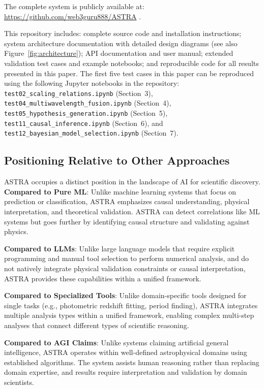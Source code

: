 \documentclass[usenatbib]{rasti}
\begin{document}
The complete system is publicly available at: \url{https://github.com/web3guru888/ASTRA} \citep{astra_github}.

This repository includes: complete source code and installation instructions; system architecture documentation with detailed design diagrams (see also Figure~\ref{fig:architecture}); API documentation and user manual; extended validation test cases and example notebooks; and reproducible code for all results presented in this paper. The first five test cases in this paper can be reproduced using the following Jupyter notebooks in the repository: \texttt{test02\_scaling\_relations.ipynb} (Section~3), \texttt{test04\_multiwavelength\_fusion.ipynb} (Section~4), \texttt{test05\_hypothesis\_generation.ipynb} (Section~5), \texttt{test11\_causal\_inference.ipynb} (Section~6), and \texttt{test12\_bayesian\_model\_selection.ipynb} (Section~7).

\subsection{Positioning Relative to Other Approaches}

ASTRA occupies a distinct position in the landscape of AI for scientific discovery. \textbf{Compared to Pure ML}: Unlike machine learning systems that focus on prediction or classification, ASTRA emphasizes causal understanding, physical interpretation, and theoretical validation. ASTRA can detect correlations like ML systems but goes further by identifying causal structure and validating against physics.

\textbf{Compared to LLMs}: Unlike large language models that require explicit programming and manual tool selection to perform numerical analysis, and do not natively integrate physical validation constraints or causal interpretation, ASTRA provides these capabilities within a unified framework.

\textbf{Compared to Specialized Tools}: Unlike domain-specific tools designed for single tasks (e.g., photometric redshift fitting, period finding), ASTRA integrates multiple analysis types within a unified framework, enabling complex multi-step analyses that connect different types of scientific reasoning.

\textbf{Compared to AGI Claims}: Unlike systems claiming artificial general intelligence, ASTRA operates within well-defined astrophysical domains using established algorithms. The system assists human reasoning rather than replacing domain expertise, and results require interpretation and validation by domain scientists.
\end{document}
